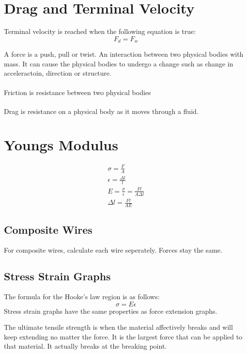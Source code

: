 \documentclass{article}
\begin{document}
\section{Drag and Terminal Velocity}
Terminal velocity is reached when the following equation is true:
\begin{equation}
	F_d = F_w
\end{equation}

A force is a push, pull or twist. An interaction between two physical bodies with mass.
It can cause the physical bodies to undergo a change such as change in acceleractoin, direction or structure.
\\\\
Friction is resistance between two physical bodies
\\\\
Drag is resistance on a physical body as it moves through a fluid.


\section{Youngs Modulus}

\begin{gather}
	\sigma = \frac{F}{A}\\
	\epsilon = \frac{\Delta l}{l}\\
	E = \frac{\sigma}{\epsilon} = \frac{Fl}{A\Delta l}\\
	\Delta l = \frac{Fl}{AE}
\end{gather}


\subsection{Composite Wires}
For composite wires, calculate each wire seperately. Forces stay the same.

\subsection{Stress Strain Graphs}

The formula for the Hooke's law region is as follows: 
\begin{equation}
	\sigma = E \epsilon
\end{equation}
Stress strain graphs have the same properties as force extension graphs.

The ultimate tensile strength is when the material affectively breaks and will keep extending no matter the force. It is the
largest force that can be applied to that material.
It actually breaks at the breaking point.
\end{document}
